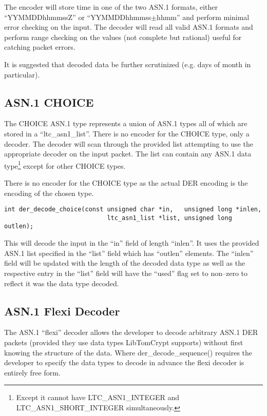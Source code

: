 \documentclass[a4paper]{book}
\begin{document}
The encoder will store time in one of the two ASN.1 formats, either ``YYMMDDhhmmssZ'' or ``YYMMDDhhmmss$\pm$hhmm'' and perform minimal error checking on the 
input.  The decoder will read all valid ASN.1 formats and perform range checking on the values (not complete but rational) useful for catching packet errors.

It is suggested that decoded data be further scrutinized (e.g. days of month in particular).

\subsection{ASN.1 CHOICE}

The CHOICE ASN.1 type represents a union of ASN.1 types all of which are stored in a ``ltc\_asn1\_list''.  There is no encoder for the CHOICE type, only a 
decoder.  The decoder will scan through the provided list attempting to use the appropriate decoder on the input packet.  The list can contain any ASN.1 data
type\footnote{Except it cannot have LTC\_ASN1\_INTEGER and LTC\_ASN1\_SHORT\_INTEGER simultaneously.} except for other CHOICE types.  

There is no encoder for the CHOICE type as the actual DER encoding is the encoding of the chosen type.  

\begin{verbatim}
int der_decode_choice(const unsigned char *in,   unsigned long *inlen,
                            ltc_asn1_list *list, unsigned long  outlen);
\end{verbatim}

This will decode the input in the ``in'' field of length ``inlen''.  It uses the provided ASN.1 list specified in the ``list'' field which has ``outlen'' elements.  
The ``inlen'' field will be updated with the length of the decoded data type as well as the respective entry in the ``list'' field will have the ``used'' flag 
set to non--zero to reflect it was the data type decoded.

\subsection{ASN.1 Flexi Decoder}
The ASN.1 ``flexi'' decoder allows the developer to decode arbitrary ASN.1 DER packets (provided they use data types LibTomCrypt supports) without first knowing
the structure of the data.  Where der\_decode\_sequence() requires the developer to specify the data types to decode in advance the flexi decoder is entirely
free form.
\end{document}

